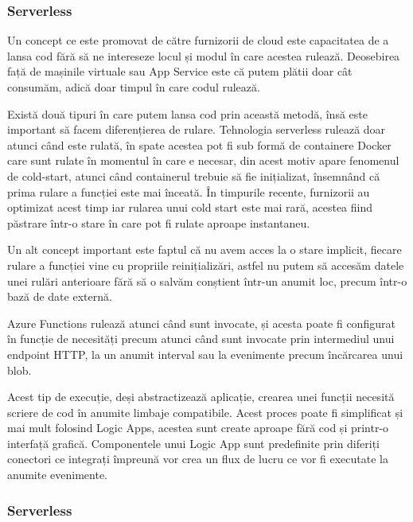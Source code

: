 \subsubsection{Serverless}

Un concept ce este promovat de către furnizorii de cloud este capacitatea de a lansa
cod fără să ne intereseze locul și modul în care acestea rulează. Deosebirea față
de mașinile virtuale sau App Service este că putem plătii doar cât consumăm, adică
doar timpul în care codul rulează.

Există două tipuri în care putem lansa cod prin această metodă, însă este important
să facem diferențierea de rulare. Tehnologia serverless rulează doar atunci când este rulată,
în spate acestea pot fi sub formă de containere Docker care sunt rulate în momentul
în care e necesar, din acest motiv apare fenomenul de cold-start, atunci când
containerul trebuie să fie inițializat, însemnând că prima rulare a funcției este mai înceată.
În timpurile recente, furnizorii au optimizat acest timp iar rularea unui cold start este mai rară,
acestea fiind păstrare într-o stare în care pot fi rulate aproape instantaneu.

Un alt concept important este faptul că nu avem acces la o stare implicit, fiecare
rulare a funcției vine cu propriile reinițializări, astfel nu putem să accesăm
datele unei rulări anterioare fără să o salvăm conștient într-un anumit loc, precum într-o bază de
date externă.

Azure Functions rulează atunci când sunt invocate, și acesta poate fi configurat
în funcție de necesități precum atunci când sunt invocate prin intermediul unui endpoint HTTP,
la un anumit interval sau la evenimente precum încărcarea unui blob.

Acest tip de execuție, deși abstractizează aplicație, crearea unei funcții
necesită scriere de cod în anumite limbaje compatibile. Acest proces poate fi
simplificat și mai mult folosind Logic Apps, acestea sunt create aproape fără cod
și printr-o interfață grafică. Componentele unui Logic App sunt predefinite prin diferiți conectori
ce integrați împreună vor crea un flux de lucru ce vor fi executate la anumite evenimente.

\subsubsection{Serverless}
